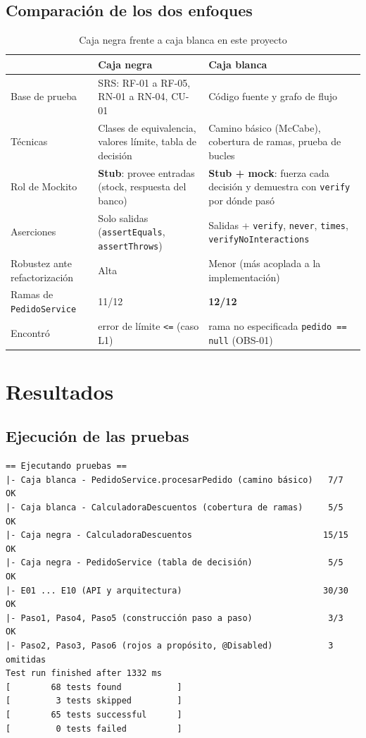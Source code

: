\documentclass[11pt,a4paper,oneside]{report}
\newcommand{\code}[1]{\texttt{#1}}
\begin{document}
\section{Comparación de los dos enfoques}
\begin{table}[H]
\centering
\caption{Caja negra frente a caja blanca en este proyecto}
\small
\begin{tabularx}{\linewidth}{lXX}
\toprule
& \textbf{Caja negra} & \textbf{Caja blanca}\\
\midrule
Base de prueba & SRS: RF-01 a RF-05, RN-01 a RN-04, CU-01 & Código fuente y grafo de flujo\\
Técnicas & Clases de equivalencia, valores límite, tabla de decisión & Camino básico (McCabe), cobertura de ramas, prueba de bucles\\
Rol de Mockito & \textbf{Stub}: provee entradas (stock, respuesta del banco) & \textbf{Stub + mock}: fuerza cada decisión y demuestra con \code{verify} por dónde pasó\\
Aserciones & Solo salidas (\code{assertEquals}, \code{assertThrows}) & Salidas + \code{verify}, \code{never}, \code{times}, \code{verifyNoInteractions}\\
Robustez ante refactorización & Alta & Menor (más acoplada a la implementación)\\
Ramas de \code{PedidoService} & 11/12 & \textbf{12/12}\\
Encontró & error de límite \code{<=} (caso L1) & rama no especificada \code{pedido == null} (OBS-01)\\
\bottomrule
\end{tabularx}
\end{table}

\chapter{Resultados}
\label{cap:resultados}

\section{Ejecución de las pruebas}
\begin{lstlisting}[style=bash,caption={Ejecución con \code{./run.sh cobertura} (resumen)}]
== Ejecutando pruebas ==
|- Caja blanca - PedidoService.procesarPedido (camino básico)   7/7  OK
|- Caja blanca - CalculadoraDescuentos (cobertura de ramas)     5/5  OK
|- Caja negra - CalculadoraDescuentos                          15/15 OK
|- Caja negra - PedidoService (tabla de decisión)               5/5  OK
|- E01 ... E10 (API y arquitectura)                            30/30 OK
|- Paso1, Paso4, Paso5 (construcción paso a paso)               3/3  OK
|- Paso2, Paso3, Paso6 (rojos a propósito, @Disabled)           3 omitidas
Test run finished after 1332 ms
[        68 tests found           ]
[         3 tests skipped         ]
[        65 tests successful      ]
[         0 tests failed          ]
\end{lstlisting}
\end{document}
